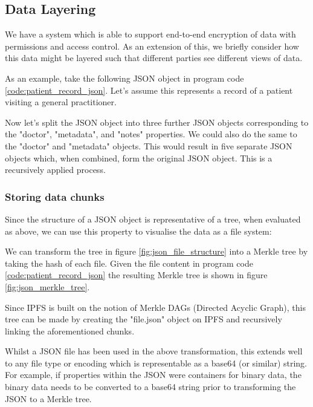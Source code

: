 \subsection{Data Layering}

We have a system which is able to support end-to-end encryption of data with permissions and access control. As an extension of this, we briefly consider how this data might be layered such that different parties see different views of data.

As an example, take the following JSON object in program code \ref{code:patient_record_json}. Let's assume this represents a record of a patient visiting a general practitioner.



Now let's split the JSON object into three further JSON objects corresponding to the "doctor", "metadata", and "notes" properties. We could also do the same to the "doctor" and "metadata" objects. This would result in five separate JSON objects which, when combined, form the original JSON object. This is a recursively applied process.

\subsubsection{Storing data chunks}

Since the structure of a JSON object is representative of a tree, when evaluated as above, we can use this property to visualise the data as a file system:



We can transform the tree in figure \ref{fig:json_file_structure} into a Merkle tree by taking the hash of each file. Given the file content in program code \ref{code:patient_record_json} the resulting Merkle tree is shown in figure \ref{fig:json_merkle_tree}.



Since IPFS is built on the notion of Merkle DAGs (Directed Acyclic Graph), this tree can be made by creating the "file.json" object on IPFS and recursively linking the aforementioned chunks.

Whilst a JSON file has been used in the above transformation, this extends well to any file type or encoding which is representable as a base64 (or similar) string. For example, if properties within the JSON were containers for binary data, the binary data needs to be converted to a base64 string prior to transforming the JSON to a Merkle tree.

